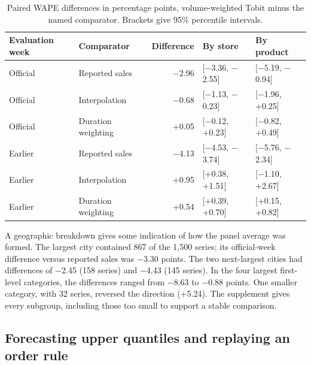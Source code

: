 \documentclass[11pt,a4paper]{article}
\begin{document}
\begin{table}[htbp]\centering\small
\caption{Paired WAPE differences in percentage points, volume-weighted Tobit minus the named comparator. Brackets give 95\% percentile intervals.}


\begin{tabular}{@{}llrll@{}}\toprule

Evaluation week & Comparator & Difference & By store & By product \\

\midrule

Official & Reported sales & \ensuremath{-}2.96 & {[}\ensuremath{-}3.36, \ensuremath{-}2.55{]} & {[}\ensuremath{-}5.19, \ensuremath{-}0.94{]} \\

Official & Interpolation & \ensuremath{-}0.68 & {[}\ensuremath{-}1.13, \ensuremath{-}0.23{]} & {[}\ensuremath{-}1.96, +0.25{]} \\

Official & Duration weighting & +0.05 & {[}\ensuremath{-}0.12, +0.23{]} & {[}\ensuremath{-}0.82, +0.49{]} \\

Earlier & Reported sales & \ensuremath{-}4.13 & {[}\ensuremath{-}4.53, \ensuremath{-}3.74{]} & {[}\ensuremath{-}5.76, \ensuremath{-}2.34{]} \\

Earlier & Interpolation & +0.95 & {[}+0.38, +1.51{]} & {[}\ensuremath{-}1.10, +2.67{]} \\

Earlier & Duration weighting & +0.54 & {[}+0.39, +0.70{]} & {[}+0.15, +0.82{]} \\

\bottomrule\end{tabular}\end{table}

A geographic breakdown gives some indication of how the panel average was formed. The largest city contained 867 of the 1,500 series; its official-week difference versus reported sales was \ensuremath{-}3.30 points. The two next-largest cities had differences of \ensuremath{-}2.45 (158 series) and \ensuremath{-}4.43 (145 series). In the four largest first-level categories, the differences ranged from \ensuremath{-}8.63 to \ensuremath{-}0.88 points. One smaller category, with 32 series, reversed the direction (+5.24). The supplement gives every subgroup, including those too small to support a stable comparison.

\subsection{Forecasting upper quantiles and replaying an order rule}
\end{document}
